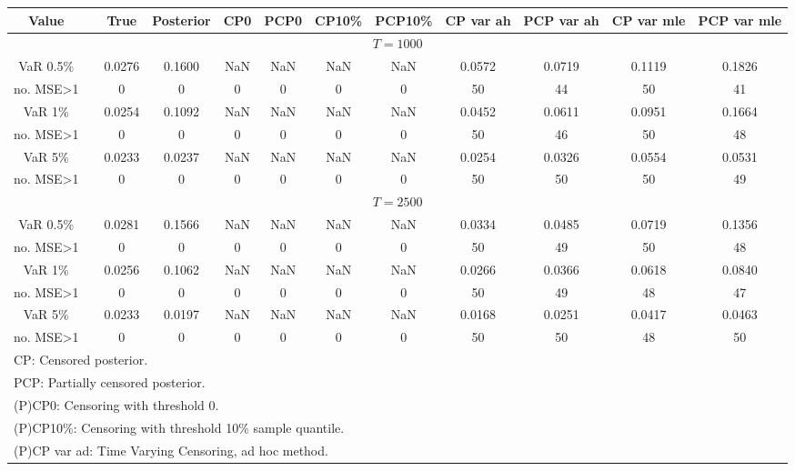 { \renewcommand{\arraystretch}{1.2} 
\begin{sidewaystable} 
\center 
\begin{tabular}{cc cc cccc cccc} 
Value && True & Posterior & CP0  & PCP0 & CP10\%  & PCP10\% &CP var ah & PCP var ah & CP var mle & PCP var mle \\ \hline 
\hline 
\multicolumn{12}{c}{$T =1000$}  \\ 
\hline 
VaR 0.5\% && 0.0276 & 0.1600 &    NaN &    NaN &    NaN &    NaN &0.0572 & 0.0719 & 0.1119 & 0.1826 \\ 
no. MSE>1 && 0 & 0 & 0 & 0 & 0 & 0 &50 & 44 & 50 & 41 \\[1ex] 
VaR 1\% && 0.0254 & 0.1092 &    NaN &    NaN &    NaN &    NaN &0.0452 & 0.0611 & 0.0951 & 0.1664 \\ 
no. MSE>1 && 0 & 0 & 0 & 0 & 0 & 0 &50 & 46 & 50 & 48 \\[1ex] 
VaR 5\% && 0.0233 & 0.0237 &    NaN &    NaN &    NaN &    NaN &0.0254 & 0.0326 & 0.0554 & 0.0531 \\ 
no. MSE>1 && 0 & 0 & 0 & 0 & 0 & 0 &50 & 50 & 50 & 49 \\[1ex] 
\hline 
\multicolumn{12}{c}{$T =2500$}  \\ 
\hline 
VaR 0.5\% && 0.0281 & 0.1566 &    NaN &    NaN &    NaN &    NaN &0.0334 & 0.0485 & 0.0719 & 0.1356 \\ 
no. MSE>1 && 0 & 0 & 0 & 0 & 0 & 0 &50 & 49 & 50 & 48 \\[1ex] 
VaR 1\% && 0.0256 & 0.1062 &    NaN &    NaN &    NaN &    NaN &0.0266 & 0.0366 & 0.0618 & 0.0840 \\ 
no. MSE>1 && 0 & 0 & 0 & 0 & 0 & 0 &50 & 49 & 48 & 47 \\[1ex] 
VaR 5\% && 0.0233 & 0.0197 &    NaN &    NaN &    NaN &    NaN &0.0168 & 0.0251 & 0.0417 & 0.0463 \\ 
no. MSE>1 && 0 & 0 & 0 & 0 & 0 & 0 &50 & 50 & 48 & 50 \\[1ex] 
\hline 
\multicolumn{12}{l}{\footnotesize{CP: Censored posterior.}}  \\ 
\multicolumn{12}{l}{\footnotesize{PCP: Partially censored posterior.}} \\ 
\multicolumn{12}{l}{\footnotesize{(P)CP0: Censoring with threshold 0.}} \\ 
\multicolumn{12}{l}{\footnotesize{(P)CP10\%: Censoring with threshold 10\% sample quantile.}}  \\ 
\multicolumn{12}{l}{\footnotesize{(P)CP var ad: Time Varying Censoring, ad hoc method.}} \\ 

\end{tabular}
\end{sidewaystable}}
